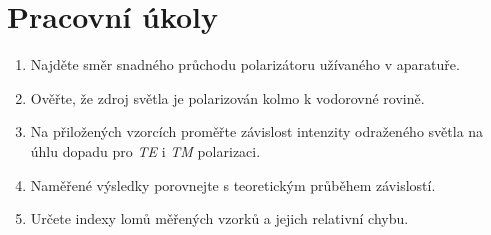\documentclass[a4paper]{article}
\author{Vladislav Wohlrath}
\begin{document}
\begin{titlepage}

\end{titlepage}

\section*{Pracovní úkoly}
\begin{enumerate}
\item Najděte směr snadného průchodu polarizátoru užívaného v aparatuře.
\item Ověřte, že zdroj světla je polarizován kolmo k vodorovné rovině.
\item Na přiložených vzorcích proměřte závislost intenzity odraženého světla na úhlu dopadu pro \emph{TE} i \emph{TM} polarizaci.
\item Naměřené výsledky porovnejte s teoretickým průběhem závislostí.
\item Určete indexy lomů měřených vzorků a jejich relativní chybu.

\end{enumerate}










\printbibliography[title={Seznam použité literatury}]
\end{document}
